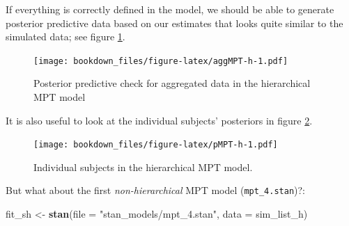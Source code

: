 \documentclass[12pt,]{krantz}
\newenvironment{Shaded}{\begin{snugshade}}{\end{snugshade}}
\newcommand{\DataTypeTok}[1]{\textcolor[rgb]{0.13,0.29,0.53}{#1}}
\newcommand{\KeywordTok}[1]{\textcolor[rgb]{0.13,0.29,0.53}{\textbf{#1}}}
\newcommand{\NormalTok}[1]{#1}
\newcommand{\OperatorTok}[1]{\textcolor[rgb]{0.81,0.36,0.00}{\textbf{#1}}}
\newcommand{\StringTok}[1]{\textcolor[rgb]{0.31,0.60,0.02}{#1}}
\theoremstyle{definition}
\theoremstyle{definition}
\theoremstyle{definition}
\theoremstyle{remark}
\begin{document}
If everything is correctly defined in the model, we should be able to generate posterior predictive data based on our estimates that looks quite similar to the simulated data; see figure \ref{fig:aggMPT-h}.

\begin{Shaded}
\end{Shaded}

\begin{figure}
\centering
\texttt{[image: bookdown\_files/figure-latex/aggMPT-h-1.pdf]}
\caption{\label{fig:aggMPT-h}Posterior predictive check for aggregated data in the hierarchical MPT model}
\end{figure}

It is also useful to look at the individual subjects' posteriors in figure \ref{fig:pMPT-h}.

\begin{Shaded}
\end{Shaded}

\begin{figure}
\centering
\texttt{[image: bookdown\_files/figure-latex/pMPT-h-1.pdf]}
\caption{\label{fig:pMPT-h}Individual subjects in the hierarchical MPT model.}
\end{figure}

But what about the first \emph{non-hierarchical} MPT model (\texttt{mpt\_4.stan})?:

\begin{Shaded}
\begin{Highlighting}[]
\NormalTok{fit_sh <-}\StringTok{ }\KeywordTok{stan}\NormalTok{(}\DataTypeTok{file =} \StringTok{"stan_models/mpt_4.stan"}\NormalTok{, }\DataTypeTok{data =}\NormalTok{ sim_list_h)  }
\end{Highlighting}
\end{Shaded}
\end{document}
